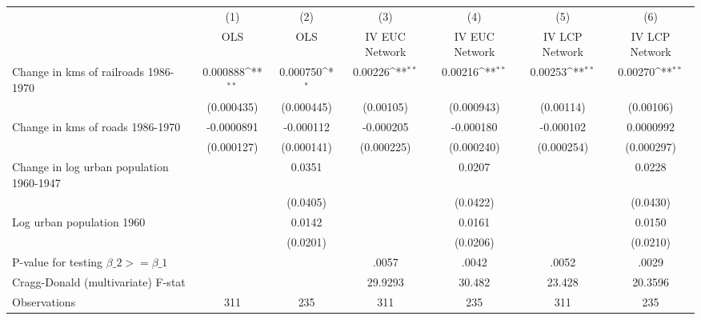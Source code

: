 {
\def\sym#1{\ifmmode^{#1}\else\(^{#1}\)\fi}
\begin{tabular}{l*{6}{c}}
\hline\hline
                &\multicolumn{1}{c}{(1)}&\multicolumn{1}{c}{(2)}&\multicolumn{1}{c}{(3)}&\multicolumn{1}{c}{(4)}&\multicolumn{1}{c}{(5)}&\multicolumn{1}{c}{(6)}\\
                &\multicolumn{1}{c}{OLS}&\multicolumn{1}{c}{OLS}&\multicolumn{1}{c}{IV EUC Network}&\multicolumn{1}{c}{IV EUC Network}&\multicolumn{1}{c}{IV LCP Network}&\multicolumn{1}{c}{IV LCP Network}\\
\hline
Change in kms of railroads 1986-1970& 0.000888\sym{**} & 0.000750\sym{*}  &  0.00226\sym{**} &  0.00216\sym{**} &  0.00253\sym{**} &  0.00270\sym{**} \\
                &(0.000435)         &(0.000445)         &(0.00105)         &(0.000943)         &(0.00114)         &(0.00106)         \\
[1em]
Change in kms of roads 1986-1970&-0.0000891         &-0.000112         &-0.000205         &-0.000180         &-0.000102         &0.0000992         \\
                &(0.000127)         &(0.000141)         &(0.000225)         &(0.000240)         &(0.000254)         &(0.000297)         \\
[1em]
Change in log urban population 1960-1947&                  &   0.0351         &                  &   0.0207         &                  &   0.0228         \\
                &                  & (0.0405)         &                  & (0.0422)         &                  & (0.0430)         \\
[1em]
Log urban population 1960&                  &   0.0142         &                  &   0.0161         &                  &   0.0150         \\
                &                  & (0.0201)         &                  & (0.0206)         &                  & (0.0210)         \\
\hline
P-value for testing $\beta\_{2} >= \beta\_{1}$&                  &                  &    .0057         &    .0042         &    .0052         &    .0029         \\
Cragg-Donald (multivariate) F-stat&                  &                  &  29.9293         &   30.482         &   23.428         &  20.3596         \\
Observations    &      311         &      235         &      311         &      235         &      311         &      235         \\
\hline\hline
\end{tabular}
}
